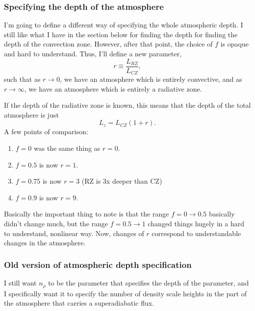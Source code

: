 \documentclass[aps, pre, onecolumn, nofootinbib, notitlepage, groupedaddress, amsfonts, amssymb, amsmath, longbibliography]{revtex4-1}
\begin{document}
\subsubsection{Specifying the depth of the atmosphere}
I'm going to define a different way of specifying the whole atmospheric depth.  I still like what
I have in the section below for finding the depth for finding the depth of the convection zone.
However, after that point, the choice of $f$ is opaque and hard to understand.  Thus, I'll
define a new parameter,
\begin{equation}
r \equiv \frac{L_{RZ}}{L_{CZ}},
\end{equation}
such that as $r \rightarrow 0$, we have an atmosphere which is entirely convective, and
as $r \rightarrow \infty$, we have an atmosphere which is entirely a radiative zone.

If the depth of the radiative zone is known, this means that the depth of the total
atmosphere is just
\begin{equation}
\boxed{
L_z = L_{CZ}(1 + r)}.
\end{equation}
A few points of comparison:
\begin{enumerate}
\item $f = 0$ was the same thing as $r = 0$.
\item $f = 0.5$ is now $r = 1$.
\item $f = 0.75$ is now $r = 3$ (RZ is 3x deeper than CZ)
\item $f = 0.9$  is now $r = 9$.  
\end{enumerate}
Basically the important thing to note is that the range $f = 0 \rightarrow 0.5$ basically didn't
change much, but the range $f = 0.5 \rightarrow 1$ changed things hugely in a hard to understand,
nonlinear way.  Now, changes of $r$ correspond to understandable changes in the atmosphere.

\subsubsection{Old version of atmospheric depth specification}
I still want $n_\rho$ to be the parameter that specifies the depth of the parameter,
and I specifically want it to specify the number of density scale heights in the part of the
atmosphere that carries a superadiabatic flux.  
\end{document}

